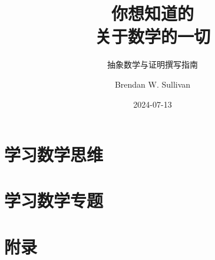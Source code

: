 \documentclass[lang=cn,color=green,12pt]{elegantbook}
\title{你想知道的\\关于数学的一切}
\subtitle{抽象数学与证明撰写指南}
\author{Brendan W. Sullivan}
\date{2024-07-13}
\begin{document}
\makecover


\frontmatter

\tableofcontents

\mainmatter

\part{学习数学思维}\label{part:Part One}








\part{学习数学专题}\label{part:Part Two}





\appendix

\part{附录}\label{part:Appendix}





\newpage

\makeunder
\end{document}
